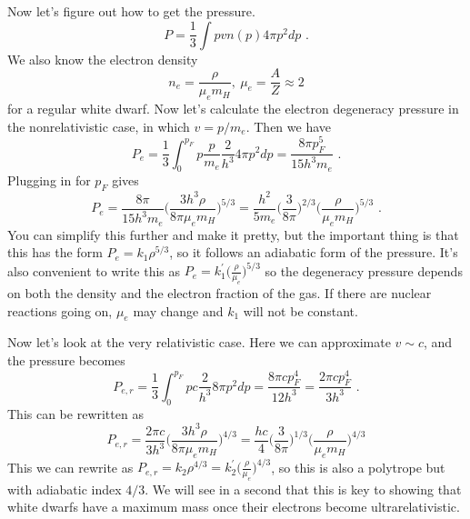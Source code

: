 \begin{enumerate}
      Now let's figure out how to get the pressure. %
      \begin{equation}
      P = \frac{1}{3} \int p v n(p) 4 \pi p^2 dp\,\,.
      \end{equation}
      We also know the electron density
      \begin{equation}
      n_e = \frac{\rho}{\mu_e m_H},~\mu_e = \frac{A}{Z} \approx 2
      \end{equation}
      for a regular white dwarf. Now let's calculate the electron degeneracy pressure in the nonrelativistic case, in which $v = p/m_e$. Then we have
      \begin{equation}
      P_e = \frac{1}{3} \int^{p_F}_0 p \frac{p}{m_e} \frac{2}{h^3} 4 \pi p^2 dp = \frac{8 \pi p_F^5}{15 h^3 m_e}\,\,.
      \end{equation}
      Plugging in for $p_F$ gives
      \begin{equation}
      P_e = \frac{8\pi}{15 h^3 m_e} \biggl( \frac{3 h^3 \rho}{8 \pi\mu_e m_H}\biggr)^{5/3} = \frac{h^2}{5 m_e} \biggl( \frac{3}{8 \pi} \biggr)^{2/3}\biggl( \frac{\rho}{\mu_e m_H} \biggr)^{5/3}\,\,.
      \end{equation}
      You can simplify this further and make it pretty, but the important thing is that this has the form $P_e = k_1 \rho^{5/3}$, so it follows an adiabatic form of the pressure. It's also convenient to write this as $P_e = k_1^\prime \biggl( \frac{\rho}{\mu_e} \biggr)^{5/3}$ so the degeneracy pressure depends on both the density and the electron fraction of the gas. If there are nuclear reactions going on, $\mu_e$ may change and $k_1$ will not be constant.
      
      Now let's look at the very relativistic case. Here we can approximate $v \sim c$, and the pressure becomes
      \begin{equation}
      P_{e,r} = \frac{1}{3} \int^{p_F}_0 p c \frac{2}{h^3} 8 \pi p^2 dp = \frac{8\pi c p_F^4}{12 h^3} = \frac{2\pi c p_F^4}{3 h^3}\,\,.
      \end{equation}
      This can be rewritten as
      \begin{equation}
      P_{e,r} = \frac{2\pi c}{3 h^3} \biggl( \frac{3 h^3 \rho}{8 \pi\mu_e m_H} \biggr)^{4/3} = \frac{h c}{4} \biggl(\frac{3}{8 \pi}\biggr)^{1/3} \biggl(\frac{\rho}{\mu_e m_H}\biggr)^{4/3}
      \end{equation}
      This we can rewrite as $P_{e,r} = k_2 \rho^{4/3} = k_2^\prime \biggl(\frac{\rho}{\mu_e}\biggr)^{4/3}$, so this is also a polytrope but with adiabatic index $4/3$. We will see in a second that this is key to showing that white dwarfs have a maximum mass once their electrons become ultrarelativistic.
      

\end{enumerate}
